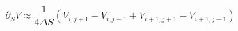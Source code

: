 \begin{equation}\label{first_wrt_S}
	\partial_S V 	\approx \frac{1}{4\Delta S}\left(V_{i,j+1} - V_{i,j-1} + V_{i+1,j+1} - V_{i+1,j-1}\right)
\end{equation}